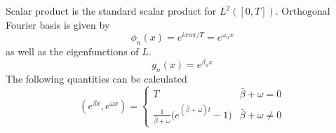 \documentclass[
a4paper,%
10pt,%
titlepage,%
twoside%
]{article}
\begin{document}
Scalar product is the standard scalar product for
$L^2([0,T])$. Orthogonal Fourier basis is given by
\begin{equation}
  \label{eq:fourier_base}
  \phi_n(x)=e^{i x n \pi/T}=e^{\omega_n x}
\end{equation}
as well as the eigenfunctions of $L$.
\begin{equation}
  g_n(x)=e^{ \beta_n x}
\end{equation}
The following quantities can be calculated
\begin{equation}
  (e^{\beta x},e^{\omega x})=
  \begin{cases}
    T & \bar\beta+\omega=0 \\
    \frac{1}{\bar{\beta}+\omega}\big(e^{(\bar\beta+\omega)t}-1\big)         & \bar\beta+\omega\ne0
  \end{cases}
\end{equation}
\end{document}
